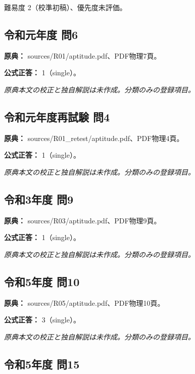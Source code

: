 \par 難易度 2（校準初稿）、優先度未評価。

\subsection{令和元年度 問6}
\label{q:r01-reg-apt-06}

\noindent\textbf{原典：} sources/R01/aptitude.pdf、PDF物理7頁。

\textbf{公式正答：} 1（single）。

\par\textit{原典本文の校正と独自解説は未作成。分類のみの登録項目。}

\subsection{令和元年度再試験 問4}
\label{q:r01-ret-apt-04}

\noindent\textbf{原典：} sources/R01\_retest/aptitude.pdf、PDF物理4頁。

\textbf{公式正答：} 1（single）。

\par\textit{原典本文の校正と独自解説は未作成。分類のみの登録項目。}

\subsection{令和3年度 問9}
\label{q:r03-reg-apt-09}

\noindent\textbf{原典：} sources/R03/aptitude.pdf、PDF物理9頁。

\textbf{公式正答：} 1（single）。

\par\textit{原典本文の校正と独自解説は未作成。分類のみの登録項目。}

\subsection{令和5年度 問10}
\label{q:r05-reg-apt-10}

\noindent\textbf{原典：} sources/R05/aptitude.pdf、PDF物理10頁。

\textbf{公式正答：} 3（single）。

\par\textit{原典本文の校正と独自解説は未作成。分類のみの登録項目。}

\subsection{令和5年度 問15}
\label{q:r05-reg-apt-15}

